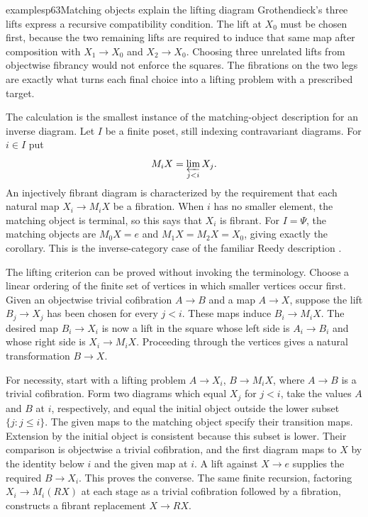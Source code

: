 \begin{dcomment}{examples}{p63}{Matching objects explain the lifting diagram}
Grothendieck's three lifts express a recursive compatibility condition. The lift at $X_0$ must be chosen first, because the two remaining lifts are required to induce that same map after composition with $X_1\to X_0$ and $X_2\to X_0$. Choosing three unrelated lifts from objectwise fibrancy would not enforce the squares. The fibrations on the two legs are exactly what turns each final choice into a lifting problem with a prescribed target.

The calculation is the smallest instance of the matching-object description for an inverse diagram. Let $I$ be a finite poset, still indexing contravariant diagrams. For $i\in I$ put
\[
                M_iX=\varprojlim_{j<i}X_j.
\]
An injectively fibrant diagram is characterized by the requirement that each natural map $X_i\to M_iX$ be a fibration. When $i$ has no smaller element, the matching object is terminal, so this says that $X_i$ is fibrant. For $I=\Psi$, the matching objects are $M_0X=e$ and $M_1X=M_2X=X_0$, giving exactly the corollary. This is the inverse-category case of the familiar Reedy description \citep[Theorem 5.1.3]{Hovey1999}.

The lifting criterion can be proved without invoking the terminology. Choose a linear ordering of the finite set of vertices in which smaller vertices occur first. Given an objectwise trivial cofibration $A\to B$ and a map $A\to X$, suppose the lift $B_j\to X_j$ has been chosen for every $j<i$. These maps induce $B_i\to M_iX$. The desired map $B_i\to X_i$ is now a lift in the square whose left side is $A_i\to B_i$ and whose right side is $X_i\to M_iX$. Proceeding through the vertices gives a natural transformation $B\to X$.

For necessity, start with a lifting problem $A\to X_i$, $B\to M_iX$, where $A\to B$ is a trivial cofibration. Form two diagrams which equal $X_j$ for $j<i$, take the values $A$ and $B$ at $i$, respectively, and equal the initial object outside the lower subset $\{j:j\leq i\}$. The given maps to the matching object specify their transition maps. Extension by the initial object is consistent because this subset is lower. Their comparison is objectwise a trivial cofibration, and the first diagram maps to $X$ by the identity below $i$ and the given map at $i$. A lift against $X\to e$ supplies the required $B\to X_i$. This proves the converse. The same finite recursion, factoring $X_i\to M_i(RX)$ at each stage as a trivial cofibration followed by a fibration, constructs a fibrant replacement $X\to RX$.


\end{dcomment}
